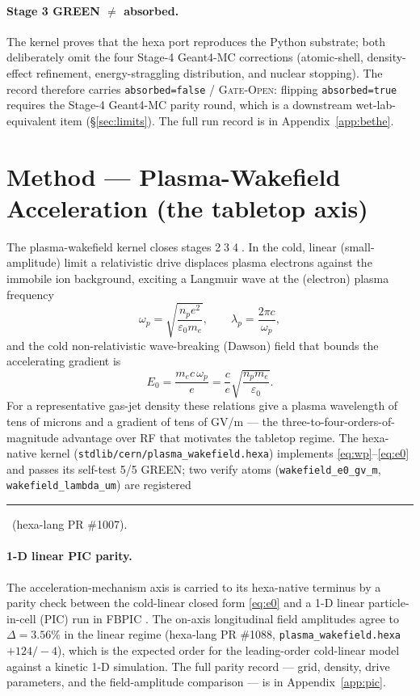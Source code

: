 \documentclass[11pt,a4paper]{article}
\newcommand{\tierdisc}[1]{\textcolor{#1}{\rule[0.05ex]{1.0ex}{1.0ex}}}
\newcommand{\tierGreen}{\tierdisc{green!60!black}}
\begin{document}
\paragraph{Stage 3 GREEN $\ne$ absorbed.} The kernel proves that the
hexa port reproduces the Python substrate; both deliberately omit the
four Stage-4 Geant4-MC corrections (atomic-shell, density-effect
refinement, energy-straggling distribution, and nuclear stopping). The
record therefore carries \texttt{absorbed=false} / \textsc{Gate-Open}:
flipping \texttt{absorbed=true} requires the Stage-4 Geant4-MC parity
round, which is a downstream wet-lab-equivalent item
(\S\ref{sec:limits}). The full run record is in
Appendix~\ref{app:bethe}.

\section{Method --- Plasma-Wakefield Acceleration (the tabletop axis)}
\label{sec:plasma}

The plasma-wakefield kernel closes stages
\textcircled{\scriptsize 2}\textcircled{\scriptsize 3}\textcircled{\scriptsize 4}.
In the cold, linear (small-amplitude) limit a relativistic drive
displaces plasma electrons against the immobile ion background, exciting
a Langmuir wave at the (electron) plasma frequency
\citep{dawson1959,esarey2009lpa}
\begin{equation}
\omega_p = \sqrt{\frac{n_p e^{2}}{\varepsilon_0 m_e}},
\qquad
\lambda_p = \frac{2\pi c}{\omega_p},
\label{eq:wp}
\end{equation}
and the cold non-relativistic wave-breaking (Dawson) field that bounds
the accelerating gradient is
\begin{equation}
E_0 = \frac{m_e c\,\omega_p}{e}
    = \frac{c}{e}\sqrt{\frac{n_p m_e}{\varepsilon_0}}.
\label{eq:e0}
\end{equation}
For a representative gas-jet density these relations give a plasma
wavelength of tens of microns and a gradient of tens of \si{GV/m} ---
the three-to-four-orders-of-magnitude advantage over RF that motivates
the tabletop regime. The hexa-native kernel
(\verb|stdlib/cern/plasma_wakefield.hexa|) implements
\eqref{eq:wp}--\eqref{eq:e0} and passes its self-test 5/5 GREEN; two
verify atoms (\verb|wakefield_e0_gv_m|, \verb|wakefield_lambda_um|) are
registered \tierGreen\ (hexa-lang PR \#1007).

\paragraph{1-D linear PIC parity.} The acceleration-mechanism axis is
carried to its hexa-native terminus by a parity check between the
cold-linear closed form \eqref{eq:e0} and a 1-D linear
particle-in-cell (PIC) run in FBPIC \citep{lehe2016fbpic}. The on-axis
longitudinal field amplitudes agree to $\Delta = 3.56\%$ in the linear
regime (hexa-lang PR \#1088, \verb|plasma_wakefield.hexa| $+124/-4$),
which is the expected order for the leading-order cold-linear model
against a kinetic 1-D simulation. The full parity record --- grid,
density, drive parameters, and the field-amplitude comparison --- is in
Appendix~\ref{app:pic}.
\end{document}
